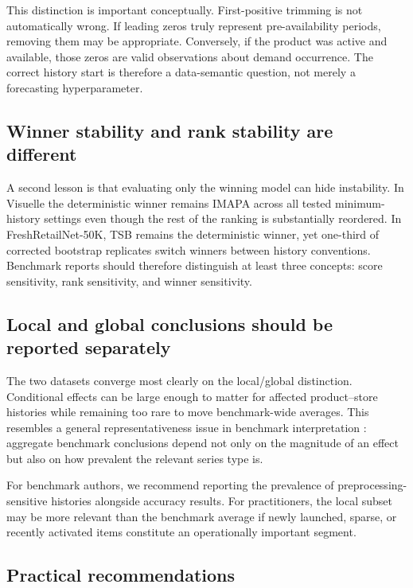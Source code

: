 This distinction is important conceptually. First-positive trimming is not automatically wrong. If leading zeros truly represent pre-availability periods, removing them may be appropriate. Conversely, if the product was active and available, those zeros are valid observations about demand occurrence. The correct history start is therefore a data-semantic question, not merely a forecasting hyperparameter.

\subsection{Winner stability and rank stability are different}

A second lesson is that evaluating only the winning model can hide instability. In Visuelle the deterministic winner remains IMAPA across all tested minimum-history settings even though the rest of the ranking is substantially reordered. In FreshRetailNet-50K, TSB remains the deterministic winner, yet one-third of corrected bootstrap replicates switch winners between history conventions. Benchmark reports should therefore distinguish at least three concepts: score sensitivity, rank sensitivity, and winner sensitivity.

\subsection{Local and global conclusions should be reported separately}

The two datasets converge most clearly on the local/global distinction. Conditional effects can be large enough to matter for affected product--store histories while remaining too rare to move benchmark-wide averages. This resembles a general representativeness issue in benchmark interpretation \citep{theodorou2022representativeness}: aggregate benchmark conclusions depend not only on the magnitude of an effect but also on how prevalent the relevant series type is.

For benchmark authors, we recommend reporting the prevalence of preprocessing-sensitive histories alongside accuracy results. For practitioners, the local subset may be more relevant than the benchmark average if newly launched, sparse, or recently activated items constitute an operationally important segment.

\subsection{Practical recommendations}

